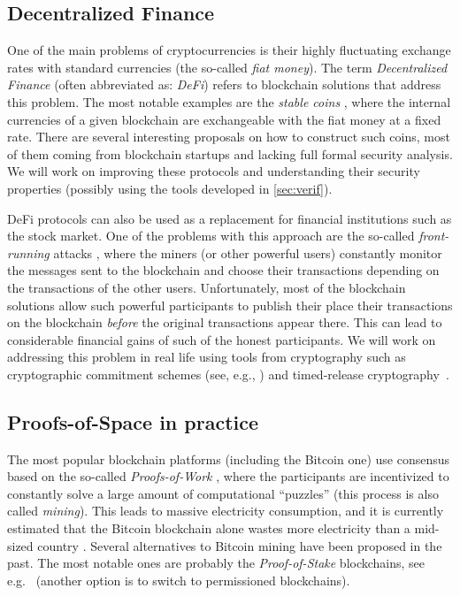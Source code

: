\documentclass{article}
\begin{document}
\subsection{Decentralized Finance}

One of the main problems of cryptocurrencies is their highly fluctuating exchange rates with standard currencies (the so-called \emph{fiat money}). The term \emph{Decentralized Finance} \cite{enwiki:1030159409} (often abbreviated as: \emph{DeFi}) refers to blockchain solutions that address this problem. The most notable examples are the \emph{stable coins} \cite{Clark2020}, where the internal currencies of a given blockchain are exchangeable with the fiat money at a fixed rate. There are several interesting proposals on how to construct such coins, most of them coming from blockchain startups and lacking full formal security analysis. We will work on improving these protocols and understanding their security properties (possibly using the tools developed in \ref{sec:verif}).
	
DeFi protocols can also be used as a replacement for financial institutions such as the stock market. One of the problems with this approach are the so-called \emph{front-running} attacks \cite{Eskandari2019}, where the miners (or other powerful users) constantly monitor the messages sent to the blockchain and choose their transactions depending on the transactions of the other users. Unfortunately, most of the blockchain solutions allow such powerful participants to publish their place their transactions on the blockchain \emph{before} the original transactions appear there. This can lead to considerable financial gains of such of the honest participants. We will work on addressing this problem in real life using tools from cryptography such as cryptographic commitment schemes (see, e.g., \cite{Goldreich2001}) and timed-release cryptography~\cite{10.5555/888615}.

\subsection{Proofs-of-Space in practice}\label{sec:PoSpace}

The most popular blockchain platforms (including the Bitcoin one) use consensus based on the so-called \emph{Proofs-of-Work} \cite{Dwork1992}, where the participants are incentivized to constantly solve a large amount of computational ``puzzles'' (this process is also called \emph{mining}). This leads to massive electricity consumption, and it is currently estimated that the Bitcoin blockchain alone wastes more electricity than a mid-sized country \cite{Criddle}. Several alternatives to Bitcoin mining have been proposed in the past. The most notable ones are probably the \emph{Proof-of-Stake} blockchains, see e.g.~\cite{Kiayias2017} (another option is to switch to permissioned blockchains).
\end{document}
